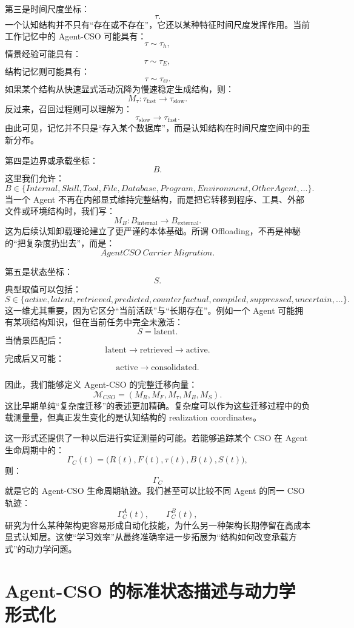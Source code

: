 第三是时间尺度坐标：
\[
\tau.
\]
一个认知结构并不只有“存在或不存在”，它还以某种特征时间尺度发挥作用。当前工作记忆中的 Agent-CSO 可能具有：
\[
\tau\sim \tau_h,
\]
情景经验可能具有：
\[
\tau\sim\tau_E,
\]
结构记忆则可能具有：
\[
\tau\sim\tau_\Theta.
\]
如果某个结构从快速显式活动沉降为慢速稳定生成结构，则：
\[
M_\tau:
\tau_{\text{fast}}
\rightarrow
\tau_{\text{slow}}.
\]
反过来，召回过程则可以理解为：
\[
\tau_{\text{slow}}
\rightarrow
\tau_{\text{fast}}.
\]
由此可见，记忆并不只是“存入某个数据库”，而是认知结构在时间尺度空间中的重新分布。

第四是边界或承载坐标：
\[
B.
\]
这里我们允许：
\[
B
\in
\{
Internal,
Skill,
Tool,
File,
Database,
Program,
Environment,
OtherAgent,
\ldots
\}.
\]
当一个 Agent 不再在内部显式维持完整结构，而是把它转移到程序、工具、外部文件或环境结构时，我们写：
\[
M_B:
B_{\text{internal}}
\rightarrow
B_{\text{external}}.
\]
这为后续认知卸载理论建立了更严谨的本体基础。所谓 Offloading，不再是神秘的“把复杂度扔出去”，而是：
\[
\boxed{
AgentCSO\ Carrier\ Migration.
}
\]

第五是状态坐标：
\[
S.
\]
典型取值可以包括：
\[
S
\in
\{
active,
latent,
retrieved,
predicted,
counterfactual,
compiled,
suppressed,
uncertain,
\ldots
\}.
\]
这一维尤其重要，因为它区分“当前活跃”与“长期存在”。例如一个 Agent 可能拥有某项结构知识，但在当前任务中完全未激活：
\[
S=\text{latent}.
\]
当情景匹配后：
\[
\text{latent}
\rightarrow
\text{retrieved}
\rightarrow
\text{active}.
\]
完成后又可能：
\[
\text{active}
\rightarrow
\text{consolidated}.
\]

因此，我们能够定义 Agent-CSO 的完整迁移向量：
\[
\boxed{
\mathcal M_{CSO}
=
\left(
M_R,
M_F,
M_\tau,
M_B,
M_S
\right).
}
\]
这比早期单纯“复杂度迁移”的表述更加精确。复杂度可以作为这些迁移过程中的负载测量量，但真正发生变化的是认知结构的 realization coordinates。

这一形式还提供了一种以后进行实证测量的可能。若能够追踪某个 CSO 在 Agent 生命周期中的：
\[
\Gamma_C(t)
=
\big(
R(t),F(t),\tau(t),B(t),S(t)
\big),
\]
则：
\[
\Gamma_C
\]
就是它的 Agent-CSO 生命周期轨迹。我们甚至可以比较不同 Agent 的同一 CSO 轨迹：
\[
\Gamma_C^A(t),
\qquad
\Gamma_C^B(t),
\]
研究为什么某种架构更容易形成自动化技能，为什么另一种架构长期停留在高成本显式认知层。这使“学习效率”从最终准确率进一步拓展为“结构如何改变承载方式”的动力学问题。

\section{Agent-CSO 的标准状态描述与动力学形式化}

